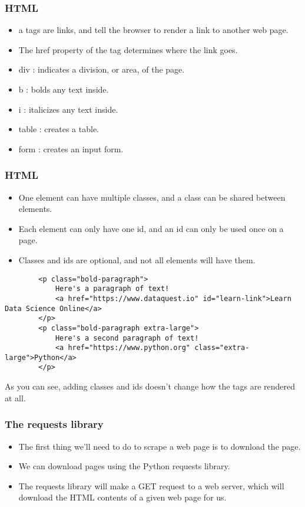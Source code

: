 \begin{frame}[fragile]\frametitle{HTML}

    \begin{itemize}
    \item  a tags are links, and tell the browser to render a link to another web page. 
    \item The href property of the tag determines where the link goes.
    \item     div : indicates a division, or area, of the page.
    \item     b : bolds any text inside.
    \item     i : italicizes any text inside.
    \item     table : creates a table.
    \item     form : creates an input form.
    \end{itemize}
\end{frame}

\begin{frame}[fragile]\frametitle{HTML}

    \begin{itemize}
    \item  One element can have multiple classes, and a class can be shared between elements.
    \item Each element can only have one id, and an id can only be used once on a page. 
    \item Classes and ids are optional, and not all elements will have them.
    \end{itemize}
    \begin{lstlisting}
        <p class="bold-paragraph">
            Here's a paragraph of text!
            <a href="https://www.dataquest.io" id="learn-link">Learn Data Science Online</a>
        </p>
        <p class="bold-paragraph extra-large">
            Here's a second paragraph of text!
            <a href="https://www.python.org" class="extra-large">Python</a>
        </p>
\end{lstlisting}
As you can see, adding classes and ids doesn't change how the tags are rendered at all.
\end{frame}

\begin{frame}[fragile]\frametitle{The requests library}

    \begin{itemize}
    \item The first thing we'll need to do to scrape a web page is to download the page. 
    \item We can download pages using the Python requests library. 
    \item The requests library will make a GET request to a web server, which will download the HTML contents of a given web page for us.
    \end{itemize}
\end{frame}

